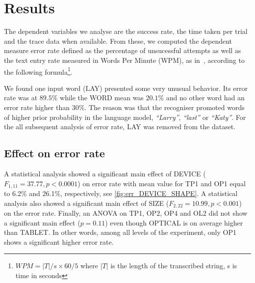 \documentclass{chi-ext}
\newcommand{\cdt}[1]{{\small\uppercase{{#1}}}}
\begin{document}
\section{Results}
The dependent variables we analyse are the success rate, the time taken per trial and the trace data when available. From these, we computed the dependent measure error rate defined as the percentage of unsucessful attempts as well as the text entry rate measured in Words Per Minute (WPM), as in~\cite{Markussen2014}, according to the following formula\footnote{$WPM = |T|/s \times 60/5$ where $|T|$ is the length of the transcribed string, s is time in seconds}.

We found one input word (\cdt{lay}) presented some very unusual behavior. Its error rate was at $89.5\%$ while the \cdt{WORD} mean was $20.1\%$ and no other word had an error rate higher than $30\%$. The reason was that the recogniser promoted words of higher prior probability in the language model, \textit{``Larry''}, \textit{``last''} or \textit{``Katy''}. For the all subsequent analysis of error rate, \cdt{lay} was removed from the dataset.

\subsection{Effect on error rate}
A statistical analysis showed a significant main effect of DEVICE ($F_{1,11} = 37.77, p < 0.0001$) on error rate with mean value for \cdt{TP1} and \cdt{OP1} equal to 6.2\% and 26.1\%, respectively, see \autoref{fig:err_DEVICE_SHAPE}. A statistical analysis also showed a significant main effect of \cdt{SIZE} ($F_{2,22} = 10.99, p < 0.001$) on the error rate. Finally, an ANOVA on \cdt{TP1}, \cdt{OP2}, \cdt{OP4} and \cdt{OL2} did not show a significant main effect ($p = 0.11$) even though \cdt{OPTICAL} is on average higher than \cdt{TABLET}. In other words, among all levels of the experiment, only \cdt{OP1} shows a significant higher error rate.
\end{document}
